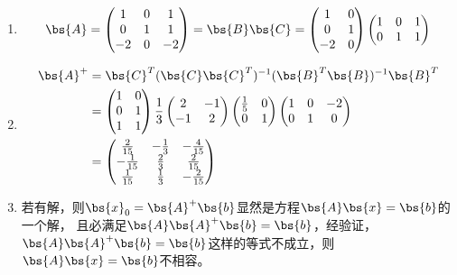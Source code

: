 \begin{enumerate}
\item 
\begin{align*}
\bs{A}=\begin{pmatrix}
    1& 0 &1 \\
    0& 1 & 1\\
    -2 & 0& -2
\end{pmatrix}=\bs{B}\bs{C}=\begin{pmatrix}
    1& 0  \\
    0& 1 \\
    -2 & 0
\end{pmatrix}\begin{pmatrix}
    1& 0  &1\\
    0& 1 &1\\
\end{pmatrix}
\end{align*}

\item  
\begin{align*}
    \bs{A}^+&=\bs{C}^T(\bs{C}\bs{C}^T)^{-1}(\bs{B}^T\bs{B})^{-1}\bs{B}^T \\
    &=\begin{pmatrix}
        1& 0  \\
        0& 1 \\
        1 & 1
    \end{pmatrix}
    \frac{1}{3}
    \begin{pmatrix}
        2& -1  \\
        -1& 2 \\
    \end{pmatrix}
    \begin{pmatrix}
        \frac{1}{5}& 0  \\
        0& 1 \\
    \end{pmatrix}
    \begin{pmatrix}
        1& 0 &-2 \\
        0& 1 & 0\\
    \end{pmatrix}\\
    &=\begin{pmatrix}
        \frac{2}{15}& -\frac{1}{3} &-\frac{4}{15} \\
        -\frac{1}{15}& \frac{2}{3} & \frac{2}{15}\\
        \frac{1}{15} & \frac{1}{3}& -\frac{2}{15}
    \end{pmatrix}
\end{align*}
\item  若有解，则$\bs{x}_0=\bs{A}^+\bs{b}$显然是方程$\bs{A}\bs{x}=\bs{b}$的一个解，
且必满足$\bs{A}\bs{A}^+\bs{b}=\bs{b}$，经验证，
$\bs{A}\bs{A}^+\bs{b}=\bs{b}$这样的等式不成立，则$\bs{A}\bs{x}=\bs{b}$不相容。


\end{enumerate}
